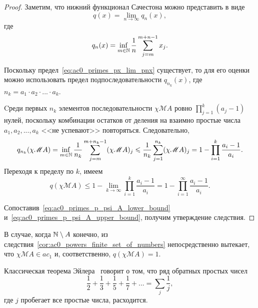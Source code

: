 \begin{proof}

	Заметим, что нижний функционал Сачестона можно представить в виде
	\begin{equation}
		\label{eq:ac0_primes_px_lim_pnx}
		q(x) = \lim_{n\to\infty} q_n(x)
		,
	\end{equation}
	где
	\begin{equation}
		q_n(x) = \inf_{m\in\mathbb{N}}  \frac{1}{n} \sum_{j=m}^{m+n-1} x_j
		.
	\end{equation}

	Поскольку предел~\eqref{eq:ac0_primes_px_lim_pnx} существует, то для его оценки можно использовать предел подпоследовательности
	$q_{n_k}(x)$, где $n_k = a_1\cdot a_2 \cdot ... \cdot a_k$.


	Cреди первых $n_k$ элементов последовательности $\chi\mathscr{M}A$
	ровно $\prod_{j=1}^k (a_j-1)$ нулей, поскольку комбинации остатков от деления
	на взаимно простые числа $a_1, a_2, ..., a_k$ <<не успевают>> повторяться.
	Следовательно,
	\begin{equation}
		q_{n_k}(\chi\mathscr{M}A) =
		\inf_{m\in\mathbb{N}}  \frac{1}{n_k} \sum_{j=m}^{m+n_k-1} (\chi\mathscr{M}A)_j
		\leqslant
		\frac{1}{n_k} \sum_{j=1}^{n_k} (\chi\mathscr{M}A)_j
		=
		1-\prod_{i=1}^k \frac{a_i-1}{a_i}
		.
	\end{equation}
	Переходя к пределу по $k$, имеем
	\begin{equation}
		\label{eq:ac0_primes_p_psi_A_lower_bound}
		q(\chi\mathscr{M}A) \leq 1-\lim_{k\to \infty} \prod_{i=1}^k \frac{a_i-1}{a_i}
		=
		1-\prod_{i=1}^\infty \frac{a_i-1}{a_i}
		.
	\end{equation}

	Сопоставив~\eqref{eq:ac0_primes_p_psi_A_lower_bound} и~\eqref{eq:ac0_primes_p_psi_A_upper_bound}, получим утверждение следствия.
\end{proof}

\begin{corollary}
	В случае, когда $\mathbb{N}\setminus A$ конечно,
	из следствия~\ref{cor:ac0_powers_finite_set_of_numbers} непосредственно вытекает, что $\chi\mathscr{M}A\in ac_1$
	и, соответственно, $q(\chi\mathscr{M}A)=1$.
\end{corollary}



Классическая теорема Эйлера~\cite{euler1737variae} говорит о том, что
ряд обратных простых чисел
\begin{equation}
	\frac{1}{2} + \frac{1}{3} + \frac{1}{5} + \frac{1}{7} + ...
	=
	\sum_j \frac{1}{j},
\end{equation}
где $j$ пробегает все простые числа, расходится.

